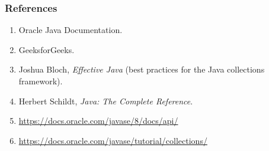 \documentclass[aspectratio=169,10pt, compress]{beamer}
\begin{document}
\begin{frame}[t,fragile] \frametitle{References}
  \begin{enumerate}
    \item Oracle Java Documentation.
    \item GeeksforGeeks.
    \item Joshua Bloch, \emph{Effective Java}
          (best practices for the Java collections framework).
    \item Herbert Schildt, \emph{Java: The Complete Reference}.
    \item \url{https://docs.oracle.com/javase/8/docs/api/}
    \item \url{https://docs.oracle.com/javase/tutorial/collections/}
  \end{enumerate}
\end{frame}




\begin{frame}[t,fragile]
	\begin{center}
		\vspace{4cm}
	\end{center}
\end{frame}
\end{document}
